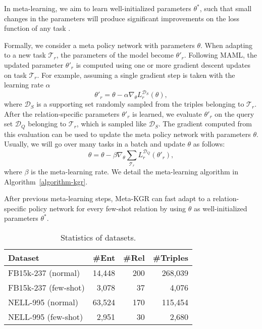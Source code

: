 \documentclass[11pt,a4paper]{article}
\begin{document}
In meta-learning, we aim to learn well-initialized parameters $\theta^*$, such that small changes in the parameters will produce significant improvements on the loss function of any task \cite{MAML}.

Formally, we consider a meta policy network with parameters $\theta$. When adapting to a new task $\mathcal{T}_r$, the parameters of the model become $\theta'_r$. Following MAML, the updated parameter $\theta'_r$ is computed using one or more gradient descent updates on task $\mathcal{T}_r$. For example, assuming a single gradient step is taken with the learning rate $\alpha$
\begin{equation}
    \theta'_r = \theta - \alpha \nabla_{\theta}L_r^{\mathcal{D}_S}(\theta),
\end{equation}
where $\mathcal{D}_S$ is a supporting set randomly sampled from the triples belonging to $\mathcal{T}_r$. After the relation-specific parameters $\theta'_r$ is learned, we evaluate $\theta'_r$ on the query set $\mathcal{D}_Q$ belonging to $\mathcal{T}_r$, which is sampled like $\mathcal{D}_S$. The gradient computed from this evaluation can be used to update the meta policy network with parameters $\theta$. Usually, we will go over many tasks in a batch and update $\theta$ as follows:
\begin{equation}
    \theta = \theta - \beta \nabla_{\theta}\sum_{\mathcal{T}_r} L_r^{\mathcal{D}_Q} (\theta'_r),
\end{equation}
where $\beta$ is the meta-learning rate. We detail the meta-learning algorithm in Algorithm~\ref{algorithm-kgr}.

After previous meta-learning steps, Meta-KGR can fast adapt to a relation-specific policy network for every few-shot relation by using $\theta$ as well-initialized parameters $\theta^*$.

\begin{table}[t]
\small
\centering
\setlength{\belowcaptionskip}{-1pt}
    \begin{tabular}{lrrr}
    \toprule
    \textbf{Dataset} & \textbf{\#Ent} & \textbf{\#Rel} & \textbf{\#Triples} \\
    \midrule
    FB15k-237 (normal) & 14,448 & 200 & 268,039 \\
    FB15k-237 (few-shot) & 3,078 & 37 & 4,076 \\
    NELL-995 (normal) & 63,524 & 170 & 115,454 \\
    NELL-995 (few-shot) & 2,951 & 30 & 2,680 \\
    \bottomrule
    \end{tabular} 
    \caption{\label{table2} Statistics of datasets.}
    \vspace{-0.8em}
\end{table}
\end{document}

